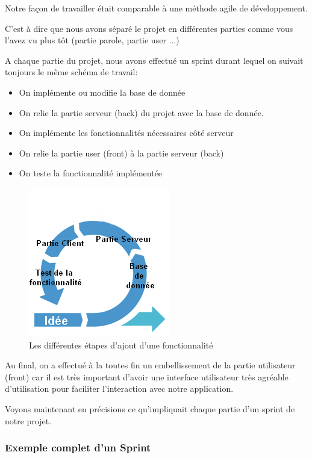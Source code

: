\documentclass[12pt,french]{article}
\begin{document}
Notre façon de travailler était comparable à une méthode agile de développement.

C'est à dire que nous avons séparé le projet en différentes parties comme vous l'avez vu plus tôt (partie parole, partie user ...)

A chaque partie du projet, nous avons effectué un sprint durant lequel on suivait toujours le même schéma de travail:

\medskip

\begin{itemize}
	\item On implémente ou modifie la base de donnée
	\item On relie la partie serveur (back) du projet avec la base de donnée.
	\item On implémente les fonctionnalités nécessaires côté serveur
	\item On relie la partie user (front) à la partie serveur (back)
	\item On teste la fonctionnalité implémentée
\end{itemize}

\begin{figure}[H]
	\centering
	\includegraphics[scale=1]{agile.png}
	\caption{Les différentes étapes d'ajout d'une fonctionnalité}    
\end{figure}

\medskip

Au final, on a effectué à la toutes fin un embellissement de la partie utilisateur (front) car il est très important d'avoir une interface utilisateur très agréable d'utilisation pour faciliter l'interaction avec notre application.

\medskip

Voyons maintenant en précisions ce qu'impliquait chaque partie d'un sprint de notre projet.

\subsubsection{Exemple complet d'un Sprint}
\end{document}
